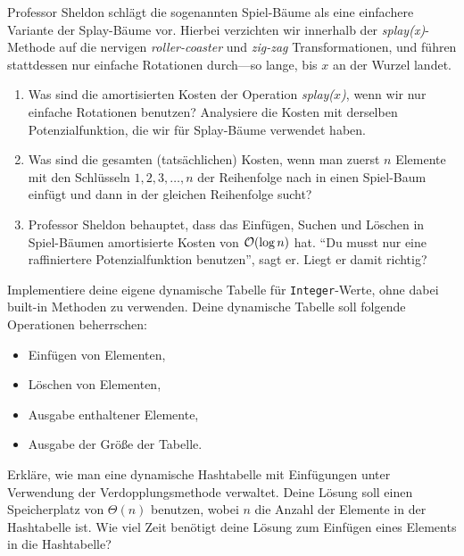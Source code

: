 \documentclass{uebung_cs}
\begin{document}
\begin{aufgabe}
	Professor Sheldon schlägt die sogenannten Spiel-Bäume als eine einfachere Variante der Splay-Bäume vor. Hierbei verzichten wir innerhalb der \emph{splay(x)}-Methode auf die nervigen \emph{roller-coaster} und \emph{zig-zag} Transformationen, und führen stattdessen nur einfache Rotationen durch---so lange, bis $x$ an der Wurzel landet.
	\begin{enumerate}
		\item Was sind die amortisierten Kosten der Operation \emph{splay($x$)}, wenn wir nur einfache Rotationen benutzen? Analysiere die Kosten mit derselben Potenzialfunktion, die wir für Splay-Bäume verwendet haben.
		\item Was sind die gesamten (tatsächlichen) Kosten, wenn man zuerst $n$ Elemente mit den Schlüsseln $1,2,3,\dots,n$ der Reihenfolge nach in einen Spiel-Baum einfügt und dann in der gleichen Reihenfolge sucht?
		\item Professor Sheldon behauptet, dass das Einfügen, Suchen und Löschen in Spiel-Bäumen amortisierte Kosten von $\mathcal{O}(\log n)$ hat. \enquote{Du musst nur eine raffiniertere Potenzialfunktion benutzen}, sagt er. Liegt er damit richtig?
	\end{enumerate}
\end{aufgabe}

\begin{aufgabe}
	Implementiere deine eigene dynamische Tabelle für \texttt{Integer}-Werte, ohne dabei built-in Methoden zu verwenden. Deine dynamische Tabelle soll folgende Operationen beherrschen:
	\begin{itemize}
		\item Einfügen von Elementen,
		\item Löschen von Elementen,
		\item Ausgabe enthaltener Elemente,
		\item Ausgabe der Größe der Tabelle.
	\end{itemize}
\end{aufgabe}

\begin{aufgabe}
	Erkläre, wie man eine dynamische Hashtabelle mit Einfügungen unter Verwendung der Verdopplungsmethode verwaltet. Deine Lösung soll einen Speicherplatz von $\Theta(n)$ benutzen, wobei $n$ die Anzahl der Elemente in der Hashtabelle ist. Wie viel Zeit benötigt deine Lösung zum Einfügen eines Elements in die Hashtabelle?
\end{aufgabe}
\end{document}
